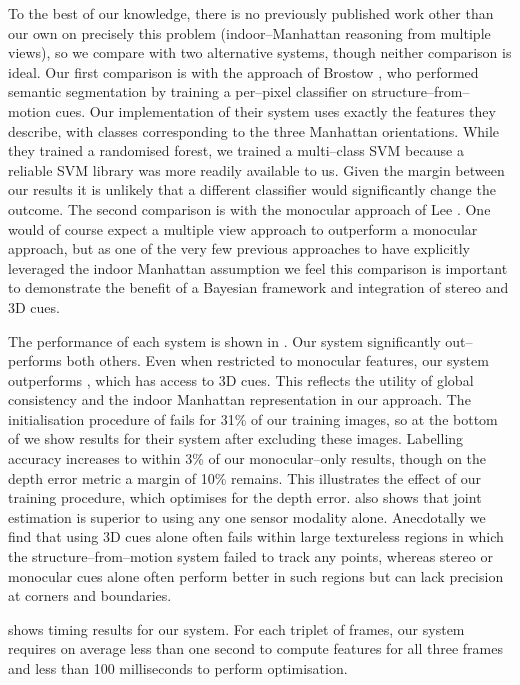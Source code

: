 To the best of our knowledge, there is no previously published work
other than our own on precisely this problem (indoor--Manhattan
reasoning from multiple views), so we compare with two alternative
systems, though neither comparison is ideal. Our first comparison is
with the approach of Brostow \etal \cite{Brostow08}, who performed
semantic segmentation by training a per--pixel classifier on
structure--from--motion cues. Our implementation of their system uses
exactly the features they describe, with classes corresponding to the
three Manhattan orientations. While they trained a randomised forest,
we trained a multi--class SVM because a reliable SVM library was more
readily available to us. Given the margin between our results it is
unlikely that a different classifier would significantly change the
outcome. The second comparison is with the monocular approach of Lee
\etal \cite{Lee09}. One would of course expect a multiple view
approach to outperform a monocular approach, but as one of the very
few previous approaches to have explicitly leveraged the indoor
Manhattan assumption we feel this comparison is important to
demonstrate the benefit of a Bayesian framework and integration of
stereo and 3D cues.

The performance of each system is shown in . Our
system significantly out--performs both others. Even when restricted
to monocular features, our system outperforms \cite{Brostow08}, which
has access to 3D cues. This reflects the utility of global consistency
and the indoor Manhattan representation in our approach. The
initialisation procedure of \cite{Lee09} fails for 31\% of our
training images, so at the bottom of  we show
results for their system after excluding these images. Labelling
accuracy increases to within 3\% of our monocular--only results,
though on the depth error metric a margin of 10\% remains. This
illustrates the effect of our training procedure, which optimises for
the depth error.  also shows that joint estimation
is superior to using any one sensor modality alone. Anecdotally we
find that using 3D cues alone often fails within large textureless
regions in which the structure--from--motion system failed to track
any points, whereas stereo or monocular cues alone often perform
better in such regions but can lack precision at corners and
boundaries.

 shows timing results for our system. For each triplet
of frames, our system requires on average less than one second to
compute features for all three frames and less than 100 milliseconds to perform
optimisation. 

